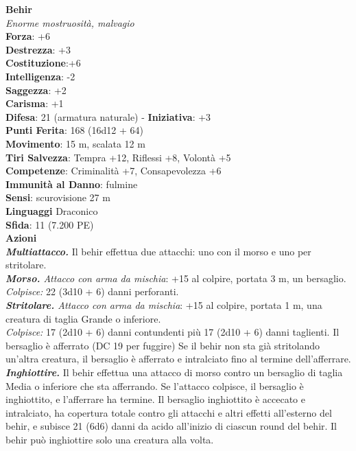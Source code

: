 \begin{multicols}{2}
\medskip\textbf{Behir}\\
\emph{Enorme mostruosità, malvagio}\\
\textbf{Forza}: +6\\
\textbf{Destrezza}: +3\\
\textbf{Costituzione}:+6\\
\textbf{Intelligenza}: -2\\
\textbf{Saggezza}: +2\\
\textbf{Carisma}: +1\\
\textbf{Difesa}: 21 (armatura naturale) - \textbf{Iniziativa}: +3\\
\textbf{Punti Ferita}: 168 (16d12 + 64)\\
\textbf{Movimento}: 15 m, scalata 12 m\\
\textbf{Tiri Salvezza}: Tempra +12, Riflessi +8, Volontà +5\\
\textbf{Competenze}: Criminalità +7, Consapevolezza +6\\
\textbf{Immunità al Danno}: fulmine\\
\textbf{Sensi}: scurovisione 27 m\\
\textbf{Linguaggi} Draconico\\
\textbf{Sfida}: 11 (7.200 PE)\smallskip\\
\smallskip\textbf{Azioni}\\
\emph{\textbf{Multiattacco.}} Il behir effettua due attacchi: uno con il morso e uno per stritolare.\\
\emph{\textbf{Morso.} Attacco con arma da mischia}: +15 al colpire, portata 3 m, un bersaglio.\\
\emph{Colpisce:} 22 (3d10 + 6) danni perforanti.\\
\emph{\textbf{Stritolare.} Attacco con arma da mischia}: +15 al colpire, portata 1 m, una creatura di taglia Grande o inferiore.\\
\emph{Colpisce:} 17 (2d10 + 6) danni contundenti più 17 (2d10 + 6) danni taglienti. Il bersaglio è afferrato (DC  19 per fuggire) Se il behir non sta già stritolando un'altra creatura, il bersaglio è afferrato e intralciato fino al termine dell'afferrare.\\
\emph{\textbf{Inghiottire.}} Il behir effettua una attacco di morso contro un bersaglio di taglia Media o inferiore che sta afferrando. Se l'attacco colpisce, il bersaglio è inghiottito, e l'afferrare ha termine. Il bersaglio inghiottito è accecato e intralciato, ha copertura totale contro gli attacchi e altri effetti all'esterno del behir, e subisce 21 (6d6) danni da acido all'inizio di ciascun round del behir. Il behir può inghiottire solo una creatura alla volta.\\

\end{multicols}
